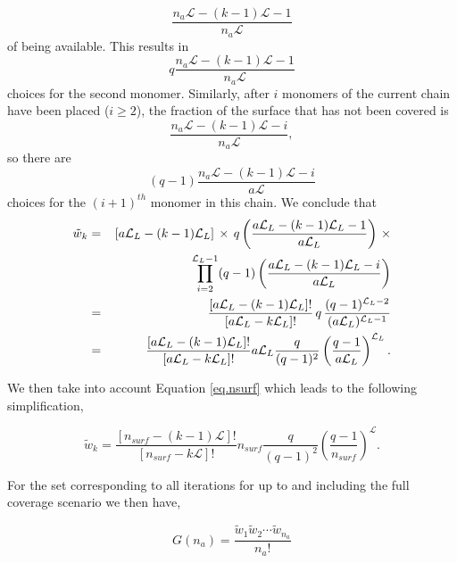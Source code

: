 \documentclass[12pt,letterpaper]{article}
\newcommand{\leng}{\mathcal{L}}
\begin{document}
$$
\frac{n_a\leng-(k-1)\leng-1}{n_a\leng}
$$
of being available.  
This results in
$$
q
\frac{
    n_a
    \leng
    -
    (k-1)
    \leng
    -
    1
}{
    n_a
    \leng
}
$$
choices for the second monomer. Similarly, after $i$ monomers of the current chain have been placed ($i\geq 2$), the fraction of the surface that has not been covered is
$$
\frac{n_a\leng-(k-1)\leng-i}{n_a\leng},
$$
so there are
$$
(q-1)
\frac{
n_a
\leng
-
(k-1)
\leng
-
i
}{
a\leng
}
$$
choices for the $(i+1)^{th}$ monomer in this chain. We conclude that 
\begin{eqnarray}
   \tilde{w}_k  & = &   [a\leng_L-(k-1)\leng_L]\,\times \,q\left(\frac{ a\leng_L-(k-1)\leng_L-1}{a\leng_L}\right)    \,\times
   \nonumber    \\
   & &    \hspace{22mm}
     \prod_{i=2}^{\leng_L-1}(q-1)\left(\frac{ a\leng_L-(k-1)\leng_L-i}{a\leng_L}\right)  
      \nonumber \\
 & = &    \frac{[a\leng_L-(k-1)\leng_L]!}{[a\leng_L-k\leng_L]!} \,q\,  \frac{(q-1)^{\leng_L-2}}{(a\leng_L)^{\leng_L-1}}  
     \nonumber    \\
     & = &    \frac{[a\leng_L-(k-1)\leng_L]!}{[a\leng_L-k\leng_L]!}   a\leng_L \frac{q}{(q-1)^2}\left(  \frac{q-1}{a\leng_L}\right)^{\leng_L}.
     \label{eq.wk2supp}
\end{eqnarray}

We then take into account Equation \ref{eq.nsurf} which leads to the following simplification,

\begin{equation}
   \tilde{w}_k 
   =
   \frac{
        [
            n_{surf}
            -
            (
                    k
                -
                1
            )
                \leng
        ]
        !
   }{
        [
            n_{surf}
            -
        k
        \leng
        ]
        !
   }   
    n_{surf}
   \frac{
        q
   }{
        (q-1)^2
   }
   \left(
        \frac{
            q
            -
            1
        }{
            n_{surf}
        }
    \right)
    ^{
            \leng
    }.
    \label{wk2supp}
\end{equation}

For the set corresponding to all iterations for up to and including the full coverage scenario we then have, 


\begin{equation}
    G(n_a) 
    =      
    \frac{
        \tilde{w}_1
        \tilde{w}_2
        \cdots 
        \tilde{w}_{n_a}
    }{
        n_a!
    }
    \label{Gofna}
\end{equation}
\end{document}
